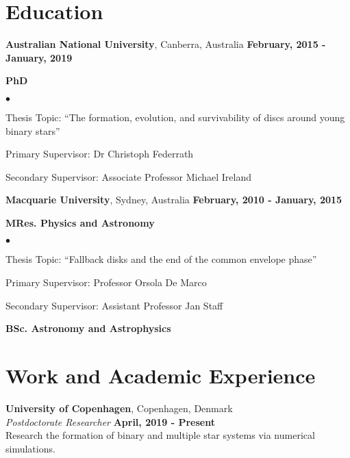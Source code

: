 \documentclass[margin,line]{res}
\newenvironment{list1}{
	\begin{list}{\ding{113}}{%
			\setlength{\itemsep}{0in}
			\setlength{\parsep}{0in} \setlength{\parskip}{0in}
			\setlength{\topsep}{0in} \setlength{\partopsep}{0in} 
			\setlength{\leftmargin}{0.17in}}}{\end{list}}
\newenvironment{list2}{
	\begin{list}{$\bullet$}{%
			\setlength{\itemsep}{0in}
			\setlength{\parsep}{0in} \setlength{\parskip}{0in}
			\setlength{\topsep}{0in} \setlength{\partopsep}{0in} 
			\setlength{\leftmargin}{0.2in}}}{\end{list}}
\begin{document}
\begin{resume}
		\section{\sc Education}
		{\bf Australian National University}, Canberra, Australia \hfill {\bf February, 2015 - January, 2019}\\
		\vspace*{-.1in}
		\begin{list1}
			\item[] {\bf PhD}
			\begin{list2}
				\vspace*{.05in}
				\item Thesis Topic:  ``The formation, evolution, and survivability of discs around young binary stars'' 
				\item Primary Supervisor: Dr Christoph Federrath
				\item Secondary Supervisor: Associate Professor Michael Ireland
			\end{list2}
		\end{list1}
		{\bf Macquarie University}, Sydney, Australia \hfill {\bf February, 2010 - January, 2015}\\ 
		\vspace*{-.1in}
		\begin{list1}
			\item[] {\bf MRes. Physics and Astronomy}
			\begin{list2}
				\vspace*{.05in}
				\item Thesis Topic:  ``Fallback disks and the end of the common envelope phase'' 
				\item Primary Supervisor:  Professor Orsola De Marco
				\item Secondary Supervisor: Assistant Professor Jan Staff
			\end{list2}
			\vspace*{.05in}
			\item[] {\bf BSc. Astronomy and Astrophysics}
		\end{list1}
		
		\section{\sc Work and Academic Experience}
		{\bf University of Copenhagen}, Copenhagen, Denmark\\
		{\em Postdoctorate Researcher} \hfill {\bf April, 2019 - Present}\\
		Research the formation of binary and multiple star systems via numerical simulations.\\
		

\end{resume}
\end{document}

